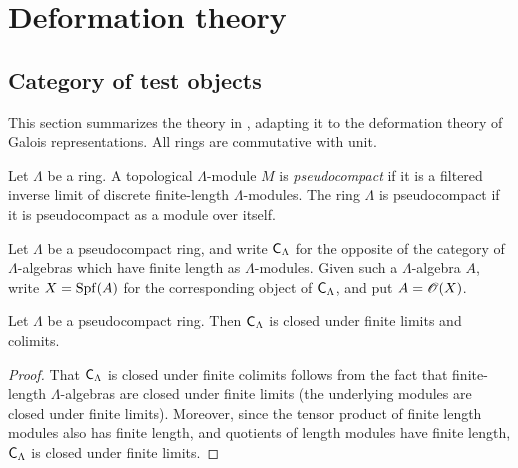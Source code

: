 
\chapter{Deformation theory}





\section{Category of test objects}

This section summarizes the theory in 
\cite[VII\textsubscript{B}, \S 0--1]{sga3-1}, adapting it to the deformation 
theory of Galois representations. All rings are commutative with unit. 

\begin{definition}
Let $\Lambda$ be a ring. A topological $\Lambda$-module $M$ is 
\emph{pseudocompact} if it is a filtered inverse limit of discrete 
finite-length $\Lambda$-modules. The ring $\Lambda$ is pseudocompact if it 
is pseudocompact as a module over itself. 
\end{definition}

Let $\Lambda$ be a pseudocompact ring, and write $\mathsf{C}_\Lambda$ for the 
opposite of the category of $\Lambda$-algebras which have finite length as 
$\Lambda$-modules. Given such a $\Lambda$-algebra $A$, write $X=\operatorname{Spf}(A)$ for 
the corresponding object of $\mathsf{C}_\Lambda$, and put $A=\mathscr{O}(X)$. 

\begin{lemma}
Let $\Lambda$ be a pseudocompact ring. Then $\mathsf{C}_\Lambda$ is closed under 
finite limits and colimits. 
\end{lemma}
\begin{proof}
That $\mathsf{C}_\Lambda$ is closed under finite colimits follows from the fact that 
finite-length $\Lambda$-algebras are closed under finite limits (the 
underlying modules are closed under finite limits). Moreover, since the tensor 
product of finite length modules also has finite length, and quotients of 
length modules have finite length, $\mathsf{C}_\Lambda$ is closed under finite 
limits. 
\end{proof}

